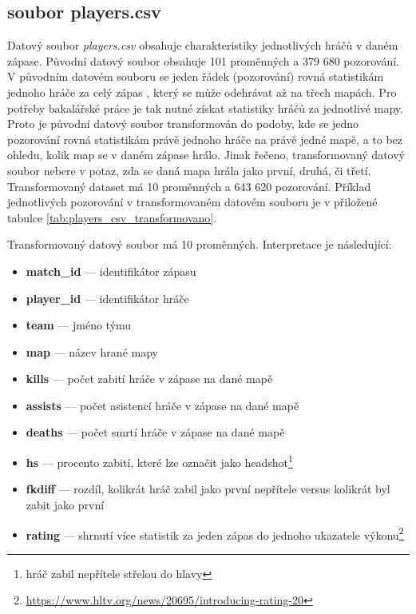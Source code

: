 \subsection{soubor players.csv}
{\color{red}
Datový soubor
}
\textit{players.csv} obsahuje 
{\color{red}
charakteristiky
}
jednotlivých hráčů v daném zápase. Původní datový soubor obsahuje 101 proměnných a 379 680 pozorování.
V původním datovém souboru se jeden řádek (pozorování) rovná statistikám jednoho hráče za celý zápas
{\color{red}
, který se může odehrávat až na třech mapách.
}
Pro potřeby bakalářské práce je tak nutné získat statistiky hráčů
za jednotlivé mapy. Proto je původní datový soubor transformován do podoby, kde se jedno pozorování rovná statistikám
právě jednoho hráče na právě jedné mapě, a to bez ohledu, kolik map se v daném zápase hrálo. Jinak řečeno, transformovaný datový soubor nebere v potaz, zda
se daná mapa hrála jako první, druhá, či třetí.
Transformovaný dataset má 10 proměnných a 643 620 pozorování. Příklad jednotlivých pozorování v transformovaném
datovém souboru je v přiložené tabulce \ref{tab:players_csv_transformovano}.


\newpage
Transformovaný 
{\color{red}
datový soubor
}
má 10 proměnných. Interpretace je následující:
\begin{itemize}
    \item \textbf{match\_id} --- identifikátor zápasu
    \item \textbf{player\_id} --- identifikátor hráče
    \item \textbf{team} --- jméno týmu
    \item \textbf{map} --- název hrané mapy
    \item \textbf{kills} --- počet zabití hráče v zápase na dané mapě
    \item \textbf{assists} --- počet asistencí hráče v zápase na dané mapě
    \item \textbf{deaths} --- počet smrtí hráče v zápase na dané mapě
    \item \textbf{hs} --- procento zabití, které lze označit jako headshot\footnote{hráč zabil nepřítele střelou do hlavy}
    \item \textbf{fkdiff} --- rozdíl, kolikrát hráč zabil jako první nepřítele versus kolikrát byl zabit jako první
    \item \textbf{rating} --- shrnutí více statistik za jeden zápas do jednoho ukazatele výkonu\footnote{\url{https://www.hltv.org/news/20695/introducing-rating-20}}
\end{itemize}

